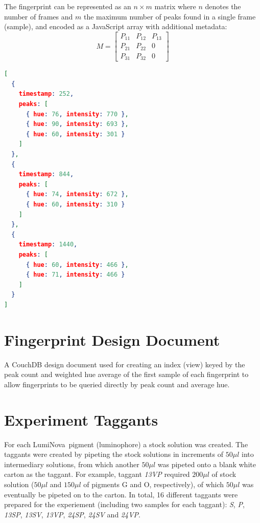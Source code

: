\documentclass[thesis.tex]{subfiles}
\begin{document}
The fingerprint can be represented as an $n \times m$ matrix where $n$ denotes the number of frames and $m$ the maximum number of peaks found in a single frame (sample), and encoded as a JavaScript array with additional metadata:
\[
M=
  \begin{bmatrix}
    P_{11} & P_{12} & P_{13} \\
    P_{21} & P_{22} & 0 \\
    P_{31} & P_{32} & 0
  \end{bmatrix}
\]
\begin{lstlisting}[language=json,firstnumber=1]
[
  {
    timestamp: 252,
    peaks: [
      { hue: 76, intensity: 770 },
      { hue: 90, intensity: 693 },
      { hue: 60, intensity: 301 }
    ]
  },
  {
    timestamp: 844,
    peaks: [
      { hue: 74, intensity: 672 },
      { hue: 60, intensity: 310 }
    ]
  },
  {
    timestamp: 1440,
    peaks: [
      { hue: 60, intensity: 466 },
      { hue: 71, intensity: 466 }
    ]
  }
]
\end{lstlisting}


\chapter{Fingerprint Design Document}
\label{appendix:fingerprint-design-doc}
A CouchDB design document used for creating an index (view) keyed by the peak count and weighted hue average of the first sample of each fingerprint to allow fingerprints to be queried directly by peak count and average hue.
\vspace{5mm}



\chapter{Experiment Taggants}
\label{appendix:taggants}
\enlargethispage{10\baselineskip}
For each LumiNova\textregistered\ pigment (luminophore) a stock solution was created. The taggants were created by pipeting the stock solutions in increments of $50\mu l$ into intermediary solutions, from which another $50\mu l$ was pipeted onto a blank white carton as the taggant. For example, taggant \emph{13VP} required $200\mu l$ of stock solution ($50\mu l$ and $150\mu l$ of pigments G and O, respectively), of which $50\mu l$ was eventually be pipeted on to the carton. In total, 16 different taggants were prepared for the experiement (including two samples for each taggant): \emph{S}, \emph{P}, \emph{13SP}, \emph{13SV}, \emph{13VP}, \emph{24SP}, \emph{24SV} and \emph{24VP}.
\end{document}
